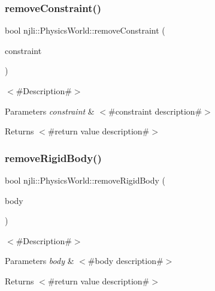 \subsubsection{\texorpdfstring{remove\+Constraint()}{removeConstraint()}}
{\footnotesize\ttfamily bool njli\+::\+Physics\+World\+::remove\+Constraint (\begin{DoxyParamCaption}\item[{\mbox{\hyperlink{classnjli_1_1_physics_constraint}{Physics\+Constraint}} $\ast$}]{constraint }\end{DoxyParamCaption})}

$<$\#\+Description\#$>$


\begin{DoxyParams}{Parameters}
{\em constraint} & $<$\#constraint description\#$>$\\
\hline
\end{DoxyParams}
\begin{DoxyReturn}{Returns}
$<$\#return value description\#$>$ 
\end{DoxyReturn}
\mbox{\label{classnjli_1_1_physics_world_a90eadf9bf47cb07aaa058e38ffb81f2a}} 
\subsubsection{\texorpdfstring{remove\+Rigid\+Body()}{removeRigidBody()}}
{\footnotesize\ttfamily bool njli\+::\+Physics\+World\+::remove\+Rigid\+Body (\begin{DoxyParamCaption}\item[{\mbox{\hyperlink{classnjli_1_1_physics_body_rigid}{Physics\+Body\+Rigid}} $\ast$}]{body }\end{DoxyParamCaption})}

$<$\#\+Description\#$>$


\begin{DoxyParams}{Parameters}
{\em body} & $<$\#body description\#$>$\\
\hline
\end{DoxyParams}
\begin{DoxyReturn}{Returns}
$<$\#return value description\#$>$ 
\end{DoxyReturn}
\mbox{\label{classnjli_1_1_physics_world_ac3fe9c56c88ef269803ee550975f0a4c}} 
